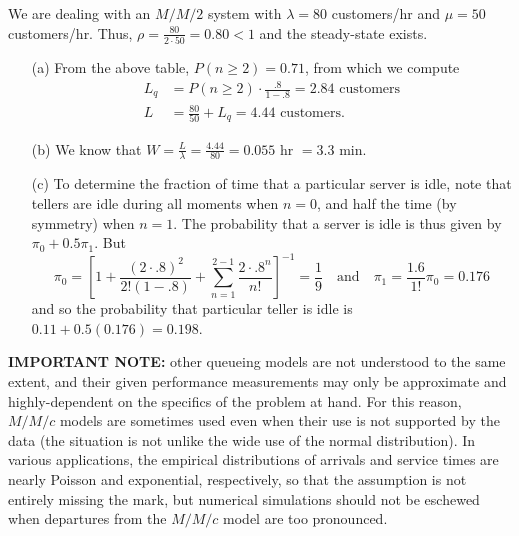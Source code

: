 We are dealing with an $M/M/2$ system with $\lambda =80 $ customers/hr and $\mu = 50$ customers/hr. Thus, $\rho = \frac{80}{2\cdot 50} = 0.80 < 1$ and the steady-state exists. 
\begin{itemize}[noitemsep]
	\item[(a)]  From the above table, $P(n \geq 2) = 0.71$, from which we compute 
\begin{align*} L_{q} &= P( n \geq 2)\cdot \frac{.8}{1-.8} = 2.84 \text{ customers}\\
L& = 	\frac{80}{50} + L_{q}	= 4.44 \text{ customers.} \end{align*}
\item[(b)]	We know that $W = \frac{L}{\lambda} = \frac{4.44}{80} = 0.055 \text{ hr }= 3.3 $ min.
\item[(c)] To determine the fraction of time that a particular server is idle, note that tellers are idle during all moments when $n=0 $, and half the time (by symmetry) when $n = 1$. The probability that a server is idle is thus given by $ \pi_{0} + 0.5 \pi_{1}$. But
 $$\pi_{0} = \left[1 + \frac{\left(2\cdot .8\right)^{2}}{2! \left(1-.8\right)} + \sum^{2-1}_{n=1} \frac{2\cdot .8^{n}}{n!}\right]^{-1}= \frac{1}{9} \quad\mbox{and}\quad \pi_{1} = \frac{1.6}{1!} \pi_{0} = 0.176$$ and so the probability that particular teller is idle is $0.11 + 0.5(0.176) = 0.198$.
\end{itemize}
\textbf{IMPORTANT NOTE:} other queueing models are not understood to the same extent, and their given performance measurements may only be approximate and highly-dependent on the specifics of the problem at hand. For this reason, $M/M/c$ models are sometimes used even when their use is not supported by the data (the situation is not unlike the wide use of the normal distribution). In various applications, the empirical distributions of arrivals and service times are nearly Poisson and exponential, respectively, so that the assumption is not entirely missing the mark, but numerical simulations should not be eschewed when departures from the $M/M/c$ model are too pronounced.
